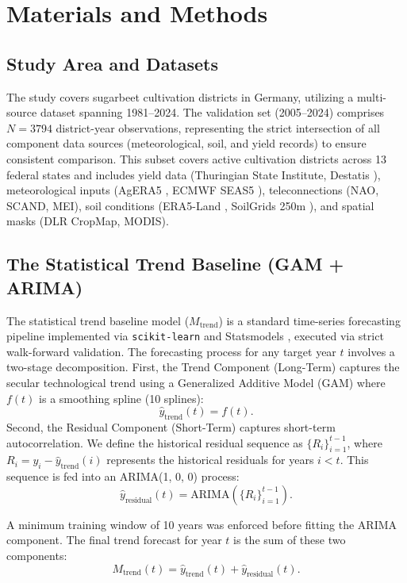 \section{Materials and Methods}

\subsection{Study Area and Datasets}
The study covers sugarbeet cultivation districts in Germany, utilizing a multi-source dataset spanning 1981--2024. The validation set (2005--2024) comprises $N=3794$ district-year observations, representing the strict intersection of all component data sources (meteorological, soil, and yield records) to ensure consistent comparison. This subset covers active cultivation districts across 13 federal states and includes yield data (Thuringian State Institute, Destatis \cite{destatis2024}), meteorological inputs (AgERA5 \cite{agera5}, ECMWF SEAS5 \cite{ecmwf_seas5}), teleconnections (NAO, SCAND, MEI), soil conditions (ERA5-Land \cite{era5land}, SoilGrids 250m \cite{hengl2017soilgrids250m}), and spatial masks (DLR CropMap\cite{dlr_cropmap}, MODIS\cite{didan2015mod13q1}).

\subsection{The Statistical Trend Baseline (GAM + ARIMA)}
The statistical trend baseline model ($M_{\text{trend}}$) is a standard time-series forecasting pipeline implemented via \texttt{scikit-learn} \cite{scikitlearn} and Statsmodels \cite{seabold2010statsmodels}, executed via strict walk-forward validation. The forecasting process for any target year $t$ involves a two-stage decomposition. First, the Trend Component (Long-Term) captures the secular technological trend using a Generalized Additive Model (GAM) where $f(t)$ is a smoothing spline (10 splines):
\[ \hat{y}_{\text{trend}}(t) = f(t). \]
Second, the Residual Component (Short-Term) captures short-term autocorrelation. We define the historical residual sequence as $\{R_i\}_{i=1}^{t-1}$, where $R_i = y_i - \hat{y}_{\text{trend}}(i)$ represents the historical residuals for years $i < t$. This sequence is fed into an ARIMA(1, 0, 0) process:
\[ \hat{y}_{\text{residual}}(t) = \text{ARIMA}(\{R_i\}_{i=1}^{t-1}). \]

A minimum training window of 10 years was enforced before fitting the ARIMA component. The final trend forecast for year $t$ is the sum of these two components:
\[ M_{\text{trend}}(t) = \hat{y}_{\text{trend}}(t) + \hat{y}_{\text{residual}}(t). \]


